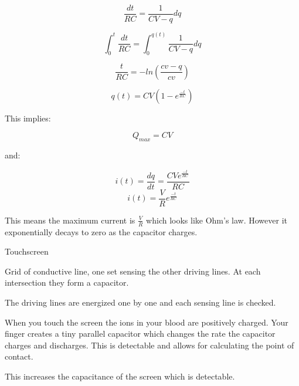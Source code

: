 \documentclass{report}
\begin{document}
\begin{description}
\begin{mdframed}
            \begin{displaymath}
                \frac{dt}{RC} = \frac{1}{CV - q}dq
            \end{displaymath}

            \begin{displaymath}
                \int_0^t \frac{dt}{RC} = \int_0^{q(t)}\frac{1}{CV-q}dq
            \end{displaymath}

            \begin{displaymath}
                \frac{t}{RC} = -ln(\frac{cv - q}{cv}) 
            \end{displaymath}
            
            \begin{displaymath}
                q(t) = CV(1-e^{\frac{-t}{RC}})     
            \end{displaymath}

            This implies:

            \begin{displaymath}
                Q_{max} = CV
            \end{displaymath}

            and:

            \begin{displaymath}
                i(t) = \frac{dq}{dt}
                = \frac{CVe^{\frac{-t}{RC}}}{RC}
            \end{displaymath}
            \begin{displaymath}
                i(t) = \frac{V}{R} e^{\frac{-t}{RC}}
            \end{displaymath}

            This means the maximum current is $\frac{V}{R}$ which
            looks like Ohm's law. However it exponentially
            decays to zero as the capacitor charges.
        \end{mdframed}
    \item {\large Touchscreen}
        \begin{mdframed}
            Grid of conductive line, one set sensing the other
            driving lines. At each intersection they form a 
            capacitor.

            The driving lines are energized one by one and
            each sensing line is checked.

            When you touch the screen the ions in your blood
            are positively charged. Your finger creates a
            tiny parallel capacitor which changes the rate
            the capacitor charges and discharges. This is
            detectable and allows for calculating the point
            of contact.

            This increases the capacitance of the screen which
            is detectable.
        \end{mdframed}
\end{description}
\end{document}
